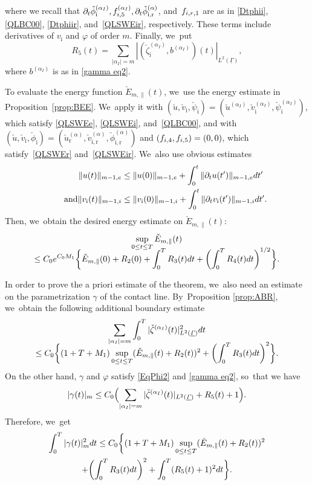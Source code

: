 \documentclass[11pt]{article}
\newcommand{\dt}{\partial_t}
\newcommand{\ul}[1]{\underline{#1}}
\newcommand{\itGamma}{\mathit{\Gamma}}
\theoremstyle{definition}
\begin{document}
where we recall that $\dt\check{\phi}_\mathrm{i}^{(\alpha_I)},f_{{\rm i},5}^{(\alpha_I)},\dt\check{\phi}_\mathrm{i,r}^{(\alpha)}$,
and~$f_{{\rm i,r},1}$ are as in \eqref{Dtphii}, \eqref{QLBC00}, \eqref{Dtphiir}, and~\eqref{QLSWEir}, respectively.
These terms include derivatives of $v_\mathrm{i}$ and $\varphi$ of order $m$.
Finally, we~put
\[
R_5(t) = \sum_{|\alpha_I|=m} |(\check{\zeta}_\mathrm{i}^{(\alpha_I)},b^{(\alpha_I)})(t)|_{L^2(\ul{\itGamma})},
\]
where $b^{(\alpha_I)}$ is as in \eqref{gamma eq2}.

To evaluate the energy function $\check{E}_{m,\parallel}(t)$, we~use the energy estimate in Proposition~\ref{prop:BEE}. We~apply it with $(\check{u},\check{v}_\mathrm{i},\check{\psi}_\mathrm{i})=(\check{u}^{(\alpha_I)},\check{v}_\mathrm{i}^{(\alpha_I)},\check{\psi}_\mathrm{i}^{(\alpha_I)})$,
which satisfy \eqref{QLSWEe}, \eqref{QLSWEi}, and~\eqref{QLBC00},
and with $(\check{u},\check{v}_\mathrm{i},\check{\phi}_\mathrm{i})=(\check{u}_\mathrm{r}^{(\alpha)},\check{v}_\mathrm{i,r}^{(\alpha)},\check{\phi}_\mathrm{i,r}^{(\alpha)})$
and $(f_{{\rm i},4},f_{{\rm i},5})=(0,0)$, which satisfy~\eqref{QLSWEr} and~\eqref{QLSWEir}. We~also use obvious estimates
\begin{align*}
\|u(t)\|_{m-1,{\rm e}} &\leq \|u(0)\|_{m-1,{\rm e}}+\int_0^t\|\dt u(t')\|_{m-1,{\rm e}}{\rm d}t'\\
\tag*{and}
\|v_\mathrm{i}(t)\|_{m-1,{\rm i}} &\leq \|v_\mathrm{i}(0)\|_{m-1,{\rm i}}+\int_0^t\|\dt v_\mathrm{i}(t')\|_{m-1,{\rm i}}{\rm d}t'.
\end{align*}
Then, we~obtain the desired energy estimate on $\check{E}_{m,\parallel}(t)$:
\begin{multline}\label{NLEE1}
\sup_{0\leq t\leq T}\check{E}_{m,\parallel}(t)\\[-8pt]
\leq C_0 e^{C_0M_1}\biggl\{ \check{E}_{m,\parallel}(0) + R_2(0) + \int_0^TR_3(t){\rm d}t + \biggl(\int_0^TR_4(t){\rm d}t \biggr)^{1/2} \biggr\}.
\end{multline}

In order to prove the a priori estimate of the theorem, we~also need an estimate on the parametrization $\gamma$ of the contact line. By~Proposition \ref{prop:ABR}, we~obtain the following additional boundary estimate
\begin{multline*}
\sum_{|\alpha_I|=m} \int_0^T |\check{\zeta}^{(\alpha_I)}(t)|_{L^2(\ul{\itGamma})}^2 {\rm d}t \\[-8pt]
\leq C_0\biggl\{ (1+T+M_1)\sup_{0\leq t\leq T}(\check{E}_{m,\parallel}(t) + R_2(t))^2 + \biggl(\int_0^TR_3(t){\rm d}t \biggr)^2 \biggr\}.
\end{multline*}
On the other hand, $\gamma$ and $\varphi$ satisfy \eqref{EqPhi2} and \eqref{gamma eq2}, so~that we have
\[
|\gamma(t)|_m \leq C_0\Bigl(\sum_{|\alpha_I|=m}|\check{\zeta}^{(\alpha_I)}(t)|_{L^2(\ul{\itGamma})} + R_5(t) + 1\Bigr).
\]
Therefore, we~get
\begin{multline}\label{NLEE2}
\int_0^T|\gamma(t)|_m^2{\rm d}t
\leq C_0 \biggl\{ (1+T+M_1)\sup_{0\leq t\leq T}(\check{E}_{m,\parallel}(t) + R_2(t))^2 \\
+ \biggl(\int_0^TR_3(t){\rm d}t \biggr)^2 + \int_0^T (R_5(t) + 1)^2{\rm d}t \biggr\}.
\end{multline}
\end{document}
